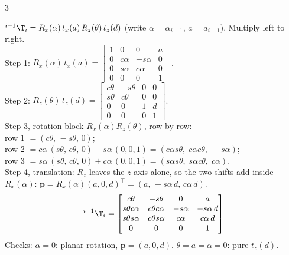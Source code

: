 \begin{multicols}{3}
\begin{fbx}
${}^{i-1}\T_i=R_x(\alpha)\,t_x(a)\,R_z(\theta)\,t_z(d)$ (write $\alpha=\alpha_{i-1}$, $a=a_{i-1}$). Multiply left to right.\\
Step 1: $R_x(\alpha)\,t_x(a)=\begin{bmatrix}1&0&0&a\\0&c\alpha&-s\alpha&0\\0&s\alpha&c\alpha&0\\0&0&0&1\end{bmatrix}$.\\
Step 2: $R_z(\theta)\,t_z(d)=\begin{bmatrix}c\theta&-s\theta&0&0\\s\theta&c\theta&0&0\\0&0&1&d\\0&0&0&1\end{bmatrix}$.\\
Step 3, rotation block $R_x(\alpha)R_z(\theta)$, row by row:\\
row 1 $=(c\theta,\,-s\theta,\,0)$;\\
row 2 $=c\alpha\,(s\theta,\,c\theta,\,0)-s\alpha\,(0,0,1)=(c\alpha s\theta,\;c\alpha c\theta,\;-s\alpha)$;\\
row 3 $=s\alpha\,(s\theta,\,c\theta,\,0)+c\alpha\,(0,0,1)=(s\alpha s\theta,\;s\alpha c\theta,\;c\alpha)$.\\
Step 4, translation: $R_z$ leaves the $z$-axis alone, so the two shifts add inside $R_x(\alpha)$: $\mathbf p=R_x(\alpha)(a,0,d)^\top=(a,\,-s\alpha\,d,\,c\alpha\,d)$.
\[{}^{i-1}\T_i=\begin{bmatrix}c\theta&-s\theta&0&a\\s\theta c\alpha&c\theta c\alpha&-s\alpha&-s\alpha\,d\\s\theta s\alpha&c\theta s\alpha&c\alpha&c\alpha\,d\\0&0&0&1\end{bmatrix}\]
Checks: $\alpha=0$: planar rotation, $\mathbf p=(a,0,d)$. $\theta=a=\alpha=0$: pure $t_z(d)$. \chk
\end{fbx}


\end{multicols}
